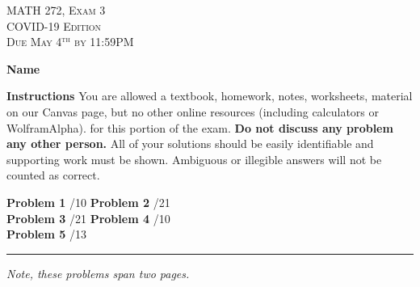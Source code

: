\documentclass[12pt]{amsbook}
\begin{document}

\begin{center}
   \textsc{\large MATH 272, Exam 3}\\
   \textsc{COVID-19 Edition}\\
   \textsc{Due May 4$^\textrm{th}$ by 11:59PM}
\end{center}
\vspace{1cm}

\noindent\textbf{Name} \; \underline{\hspace{8cm}}

\vspace{1cm}

\noindent\textbf{Instructions} \; You are allowed a textbook, homework, notes, worksheets, material on our Canvas page, but no other online resources (including calculators or WolframAlpha). for this portion of the exam.  \textbf{Do not discuss any problem any other person.} All of your solutions should be easily identifiable and supporting work must be shown.  Ambiguous or illegible answers will not be counted as correct. 


\vspace{1cm}

\begin{center}
\textbf{Problem 1} \; \underline{\hspace{1cm}}/10 \qquad \qquad
 \textbf{Problem 2} \; \underline{\hspace{1cm}}/21 \\
 \vspace*{.5cm}
 \textbf{Problem 3} \; \underline{\hspace{1cm}}/21 \qquad \qquad
  \textbf{Problem 4} \; \underline{\hspace{1cm}}/10\\
  \vspace*{.5cm}
  \textbf{Problem 5} \; \underline{\hspace{1cm}}/13 \qquad \qquad

\end{center}

\vspace{1cm}

\hrule

\vspace*{1cm}
\noindent\emph{Note, these problems span two pages.}
\end{document}
